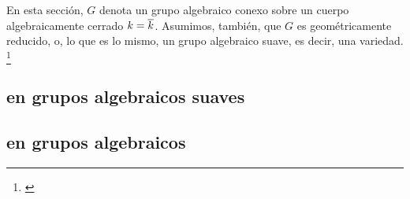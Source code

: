 \theoremstyle{plain}
\newtheorem{teoLieKolchin}{Teorema}[section]
\newtheorem{propoTriangulares}[teoLieKolchin]{Proposici\'{o}n}
\newtheorem{teoBorelConjugados}[teoLieKolchin]{Teorema}
\newtheorem{teoTorosConjugados}[teoLieKolchin]{Teorema}
\newtheorem{coroNormalizadorDelToro}[teoLieKolchin]{Corolario}
\newtheorem{teoParesConjugados}[teoLieKolchin]{Teorema}
\newtheorem{propoParabolicosPropios}[teoLieKolchin]{Proposici\'{o}n}

\theoremstyle{definition}
\newtheorem{defBorel}[teoLieKolchin]{Definition}
\newtheorem{obsBorel}[teoLieKolchin]{Observaci\'{o}n}
\newtheorem{ejemploTriangulares}[teoLieKolchin]{Ejemplo}
\newtheorem{defParabolico}[teoLieKolchin]{Definici\'{o}n}
\newtheorem{obsParabolicosPropios}[teoLieKolchin]{Observaci\'{o}n}
\newtheorem{defBorelYParabolicos}[teoLieKolchin]{Definiciones}
\newtheorem{obsBorelYParabolicos}[teoLieKolchin]{Observaci\'{o}n}
\newtheorem{defQuasiSplit}[teoLieKolchin]{Definici\'{o}n}


En esta secci\'{o}n, $G$ denota un grupo algebraico conexo sobre un cuerpo
algebraicamente cerrado $k=\overline{k}$. Asumimos, tambi\'{e}n, que $G$ es
geom\'{e}tricamente reducido, o, lo que es lo mismo, un grupo algebraico suave,
es decir, una variedad.%
\footnote{
	\cite[pp.~12,13]{MilneAlgebraicGroups}
}

\subsection{en grupos algebraicos suaves}\label{subsec:parabolicos:variedades}


\subsection{en grupos algebraicos}\label{subsec:parabolicos:algebraicos}

